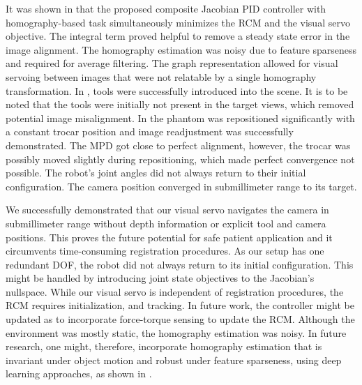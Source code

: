 It was shown in  that the proposed composite Jacobian PID controller with homography-based task simultaneously minimizes the RCM and the visual servo objective. The integral term proved helpful to remove a steady state error in the image alignment. The homography estimation was noisy due to feature sparseness and required for average filtering. The graph representation allowed for visual servoing between images that were not relatable by a single homography transformation. In , tools were successfully introduced into the scene. It is to be noted that the tools were initially not present in the target views, which removed potential image misalignment. In  the phantom was repositioned significantly with a constant trocar position and image readjustment was successfully demonstrated. The MPD got close to perfect alignment, however, the trocar was possibly moved slightly during repositioning, which made perfect convergence not possible. The robot's joint angles did not always return to their initial configuration. The camera position converged in submillimeter range to its target.

We successfully demonstrated that our visual servo navigates the camera in submillimeter range without depth information or explicit tool and camera positions. This proves the future potential for safe patient application and it circumvents time-consuming registration procedures. As our setup has one redundant DOF, the robot did not always return to its initial configuration. This might be handled by introducing joint state objectives to the Jacobian's nullspace. While our visual servo is independent of registration procedures, the RCM requires initialization, and tracking. In future work, the controller might be updated as to incorporate force-torque sensing to update the RCM. Although the environment was mostly static, the homography estimation was noisy. In future research, one might, therefore, incorporate homography estimation that is invariant under object motion and robust under feature sparseness, using deep learning approaches, as shown in \cite{huber2022deep}.
